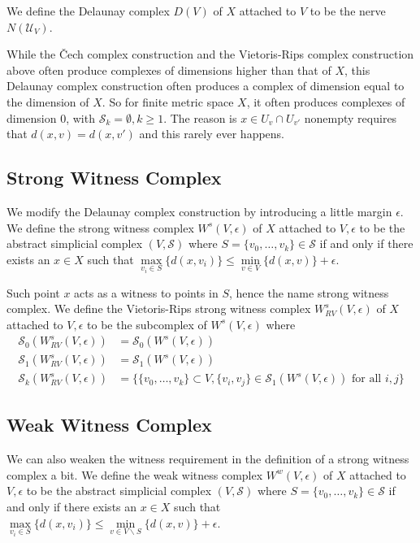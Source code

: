\documentclass[12pt]{amsart}
\theoremstyle{definition}
\begin{document}
\dfn We define the Delaunay complex $D(V)$ of $X$ attached to $V$ to be the nerve $N(\mathcal{U}_V)$.

While the \v{C}ech complex construction and the Vietoris-Rips complex construction above often produce complexes of dimensions higher than that of $X$, this Delaunay complex construction often produces a complex of dimension equal to the dimension of $X$. So for finite metric space $X$, it often produces complexes of dimension 0, with $\mathcal{S}_k = \emptyset, k \geq 1$. The reason is $x \in U_v \cap U_{v'}$ nonempty requires that $d(x, v) = d(x, v')$ and this rarely ever happens.

\subsection{Strong Witness Complex} We modify the Delaunay complex construction by introducing a little margin $\epsilon$.
\dfn We define the strong witness complex $W^s(V, \epsilon)$ of $X$ attached to $V, \epsilon$ to be the abstract simplicial complex $(V, \mathcal{S})$ where $S = \{v_0, \dots , v_k\} \in \mathcal{S}$ if and only if there exists an $x \in X$ such that $\max\limits_{v_i \in S} \{d(x, v_i)\} \leq \min\limits_{v \in V} \{d(x, v)\} + \epsilon$.

Such point $x$ acts as a witness to points in $S$, hence the name strong witness complex.
\dfn We define the Vietoris-Rips strong witness complex $W_{RV}^s(V, \epsilon)$ of $X$ attached to $V, \epsilon$ to be the subcomplex of $W^s(V, \epsilon)$ where
\begin{align*}
\mathcal{S}_0(W_{RV}^s(V, \epsilon)) & = \mathcal{S}_0(W^s(V, \epsilon)) \\
\mathcal{S}_1(W_{RV}^s(V, \epsilon)) & = \mathcal{S}_1(W^s(V, \epsilon)) \\
\mathcal{S}_k(W_{RV}^s(V, \epsilon)) & = \{\{v_0, \dots , v_k\} \subset V, \{v_i, v_j\} \in \mathcal{S}_1(W^s(V, \epsilon)) \text{ for all } i, j\}
\end{align*}

\subsection{Weak Witness Complex} We can also weaken the witness requirement in the definition of a strong witness complex a bit.
\dfn We define the weak witness complex $W^w(V, \epsilon)$ of $X$ attached to $V, \epsilon$ to be the abstract simplicial complex $(V, \mathcal{S})$ where $S = \{v_0, \dots , v_k\} \in \mathcal{S}$ if and only if there exists an $x \in X$ such that $\max\limits_{v_i \in S} \{d(x, v_i)\} \leq \min\limits_{v \in V \backslash S} \{d(x, v)\} + \epsilon$.
\end{document}
